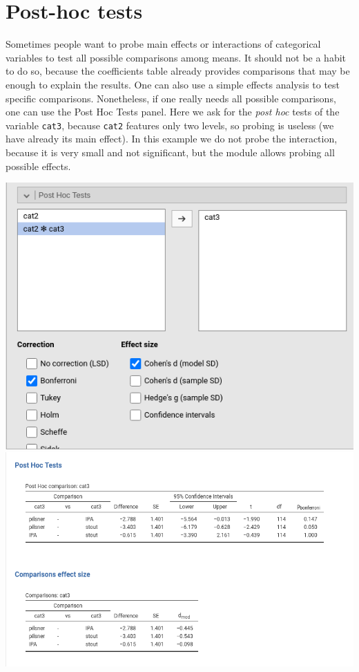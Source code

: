 \documentclass[
]{book}
\begin{document}
\hypertarget{posthoc}{%
\section{Post-hoc tests}\label{posthoc}}

Sometimes people want to probe main effects or interactions of categorical variables to test all possible comparisons among means. It should not be a habit to do so, because the coefficients table already provides comparisons that may be enough to explain the results. One can also use a simple effects analysis to test specific comparisons. Nonetheless, if one really needs all possible comparisons, one can use the {Post Hoc Tests} panel. Here we ask for the \emph{post hoc} tests of the variable \texttt{cat3}, because \texttt{cat2} features only two levels, so probing is useless (we have already its main effect). In this example we do not probe the interaction, because it is very small and not significant, but the module allows probing all possible effects.

\includegraphics{bookletpics/2_anova_input6.png}
\includegraphics{bookletpics/2_anova_output6.png}
\end{document}

